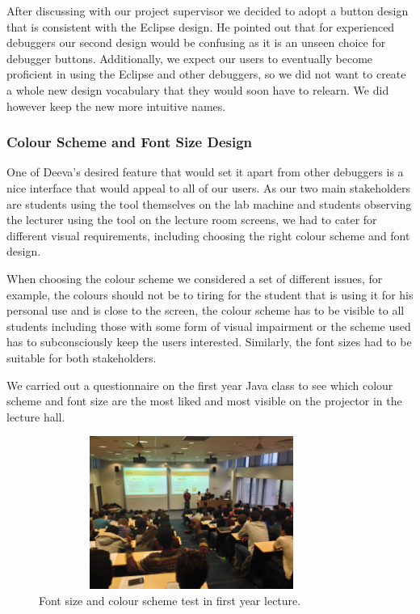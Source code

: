\documentclass[11pt, a4paper]{article}
\begin{document}
After discussing with our project supervisor we decided to adopt a button design that is consistent with the Eclipse design.
He pointed out that for experienced debuggers our second design would be confusing as it is an unseen choice for debugger buttons.
Additionally, we expect our users to eventually become proficient in using the Eclipse and other debuggers, so we did not want to create a whole new design vocabulary that they would soon have to relearn.
We did however keep the new more intuitive names.

\subsubsection{Colour Scheme and Font Size Design}
One of Deeva's desired feature that would set it apart from other debuggers is a nice interface that would appeal to all of our users.
As our two main stakeholders are students using the tool themselves on the lab machine and students observing the lecturer using the tool on the lecture room screens, we had to cater for different visual requirements, including choosing the right colour scheme and font design.

When choosing the colour scheme we considered a set of different issues, for example, the colours should not be to tiring for the student that is using it for his personal use and is close to the screen, the colour scheme has to be visible to all students including those with some form of visual impairment or the scheme used has to subconsciously keep the users interested.
Similarly, the font sizes had to be suitable for both stakeholders.

We carried out a questionnaire on the first year Java class to see which colour scheme and font size are the most liked and most visible on the projector in the lecture hall.

\begin{figure}[h!]
\centering
\includegraphics[height=50mm,width=100mm]{lectureHall.jpg}
\caption{Font size and colour scheme test in first year lecture.}
\end{figure}
\end{document}
